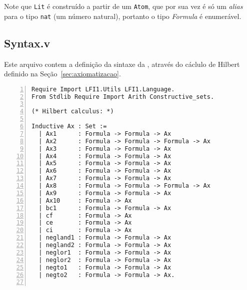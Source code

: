       Note que \texttt{Lit} é construído a partir de um \texttt{Atom}, que por sua vez é só um \textit{alias} para o tipo \texttt{nat} (um número natural), portanto o tipo \textit{Formula} é enumerável.

      \subsection{Syntax.v}\label{sec:syntax}

      Este arquivo contem a definição da sintaxe da \lfium{}, através do cáclulo de Hilbert definido na Seção~\ref{sec:axiomatizacao}.

      \begin{lstlisting}[name=Syntax, numbers=left, frame=single, language=coq]
Require Import LFI1.Utils LFI1.Language.
From Stdlib Require Import Arith Constructive_sets.

(* Hilbert calculus: *)

Inductive Ax : Set :=
  | Ax1      : Formula -> Formula -> Ax
  | Ax2      : Formula -> Formula -> Formula -> Ax
  | Ax3      : Formula -> Formula -> Ax
  | Ax4      : Formula -> Formula -> Ax
  | Ax5      : Formula -> Formula -> Ax
  | Ax6      : Formula -> Formula -> Ax
  | Ax7      : Formula -> Formula -> Ax
  | Ax8      : Formula -> Formula -> Formula -> Ax
  | Ax9      : Formula -> Formula -> Ax
  | Ax10     : Formula -> Ax
  | bc1      : Formula -> Formula -> Ax
  | cf       : Formula -> Ax
  | ce       : Formula -> Ax
  | ci       : Formula -> Ax
  | negland1 : Formula -> Formula -> Ax
  | negland2 : Formula -> Formula -> Ax
  | neglor1  : Formula -> Formula -> Ax
  | neglor2  : Formula -> Formula -> Ax
  | negto1   : Formula -> Formula -> Ax
  | negto2   : Formula -> Formula -> Ax.


\end{lstlisting}
